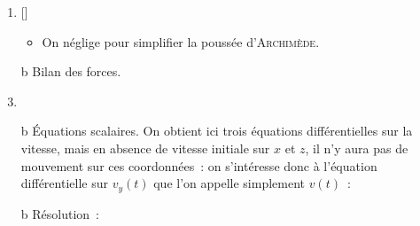 \documentclass[../../main/main.tex]{subfiles}
\begin{document}
\begin{tcb*}
\begin{isd}[righthand ratio=.3, sidebyside align=top]
\begin{center}
{			}%
			\vspace{-15pt}
		\end{center}
	\end{isd}
	\begin{enumerate}[label=\sqenumi, start=4]
		\item{}[]
		      \begin{itemize}
			      \item On néglige pour simplifier la poussée d'\textsc{Archimède}.
		      \end{itemize}
		\item[b]{Bilan des forces.}
		      \vspace{-25pt}
		\item {}
		\item[b]{Équations scalaires}.
		      On obtient ici trois équations différentielles sur la vitesse, mais en
		      absence de vitesse initiale sur $x$ et $z$, il n'y aura pas de
		      mouvement sur ces coordonnées~: on s'intéresse donc à l'équation
		      différentielle sur $v_y(t)$ que l'on appelle simplement $v(t)$~:
		      \psw{%
			      \[
				      m \dv{\yp}{t} = -mg -\alpha \yp(t)
				      \Lra
				      \dv{v}{t} + \frac{\alpha}{m}v(t) = -g
				      \Lra
				      \boxed{\dv{v}{t} + \frac{v(t)}{\tau} = -g}
				      \qav
				      \tau = \frac{m}{\alpha}
			      \]
		      }%
		\item[b]{Résolution}~:
		      \vspace{-15pt}
	\end{enumerate}
\end{tcb*}
\end{document}

